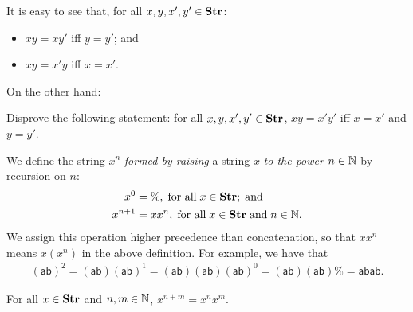 It is easy to see that, for all $x,y,x',y'\in\mathbf{Str}$:
\begin{itemize}
\item $xy=xy'$ iff $y=y'$; and

\item $xy=x'y$ iff $x=x'$.
\end{itemize}

On the other hand:

\begin{exercise}
Disprove the following statement: for all
$x,y,x',y'\in\mathbf{Str}$, $xy = x'y'$ iff $x=x'$ and $y=y'$.
\end{exercise}

We define the string $x^n$ \emph{formed by raising}
a string $x$ \emph{to the power}
%
%
%
%
%
%
%
%
$n\in\mathbb{N}$ by recursion
%
on $n$:
\begin{align*}
x^0       &= \%,\;\allowbreak\mbox{for all}\allowbreak\;x\in\mathbf{Str} ; \;\allowbreak\mbox{and}\allowbreak \\
x^{n + 1} &= xx^n,\;\allowbreak\mbox{for all}\allowbreak\;x\in\mathbf{Str}\;\allowbreak\mbox{and}\allowbreak\;n\in\mathbb{N} .
\end{align*}
We assign this operation higher precedence than concatenation, so that
$xx^n$ means $x(x^n)$ in the above definition.
For example, we have that
\begin{gather*}
(\mathsf{ab})^2 = 
(\mathsf{ab})(\mathsf{ab})^1 =
(\mathsf{ab})(\mathsf{ab})(\mathsf{ab})^0 =
(\mathsf{ab})(\mathsf{ab})\% =
\mathsf{abab} .
\end{gather*}

\begin{proposition}
\label{StrPowerProp}
For all $x\in\mathbf{Str}$ and $n,m\in\mathbb{N}$, $x^{n+m}=x^nx^m$.
\end{proposition}
%
%
%

